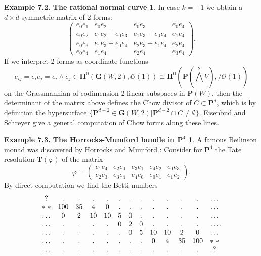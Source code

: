 \documentclass{tran-l}
\newcommand{\GG}{\mathbf{G}}
\newcommand{\myH}{\mathbf{H}}
\newcommand{\myP}{\mathbf{P}}
\newcommand{\TT}{\mathbf{T}}
\theoremstyle{plain}
\theoremstyle{remark}
\theoremstyle{definition}
\newtheorem*{definition4}{Example 7.2. The rational normal curve}
\newtheorem*{definition5}{Example 7.3. The Horrocks-Mumford bundle in $\mathbf{P}^{4}$}
\begin{document}
\begin{definition4}
In case $k=-1$ we obtain a $d \times d$ symmetric
matrix of 2-forms:
\begin{equation*}
\left(\begin{matrix}e_{0}e_{1}&e_{0}e_{2}&e_{0}e_{3}&e_{0}e_{4}\\
e_{0}e_{2}&e_{1}e_{2}+e_{0}e_{3}&e_{1}e_{3}+e_{0}e_{4}& e_{1}e_{4}\\
e_{0}e_{3}&e_{1}e_{3}+e_{0}e_{4}&e_{2}e_{3}+e_{1}e_{4}&e_{2}e_{4} \\
e_{0}e_{4}&e_{1}e_{4}&e_{2}e_{4} & e_{3}e_{4}
\end{matrix}\right)
.
\end{equation*}
If we interpret  2-forms as coordinate functions
\begin{equation*}e_{ij}=e_{i}e_{j}=e_{i}\wedge e_{j} \in \myH ^{0}(\GG
(W,2),\mathcal{O} (1)) \cong \myH ^{0}(\myP (\textstyle{\bigwedge^{2}} V),/\mathcal{O}
(1))\end{equation*}
 on the Grassmannian
of codimension 2 linear subspaces in $\myP (W)$, then the  determinant of the
matrix above defines the Chow divisor
of $C\subset \myP ^{d}$, which is by definition the
hypersurface
 $\{\myP ^{d-2} \in \GG (W,2) | \myP ^{d-2} \cap C \ne \emptyset \}$.
Eisenbud and Schreyer \cite{ES1} give a general computation of Chow forms along these lines.
\end{definition4}
\begin{definition5}
A famous Beilinson monad was discovered by Horrocks and
Mumford \cite{HM}:
Consider for $\myP ^{4}$ the Tate resolution $\TT (\varphi )$ of the matrix
\begin{equation*}
\varphi = \left(\begin{matrix}
e_{1}e_{4} & e_{2}e_{0} &e_{3}e_{1} & e_{4}e_{2} & e_{0}e_{3} \\
e_{2}e_{3} & e_{3}e_{4} &e_{4}e_{0} & e_{0}e_{1} & e_{1}e_{2} 
\end{matrix}\right).
\end{equation*}
By direct computation we find the Betti numbers
\begin{equation*}
\setcounter{MaxMatrixCols}{13}
\begin{matrix}
?         & .& . & . & . & . & . & . & . & . & . & . & \ldots \\
  *\; *
   &100&35 & 4 & 0 & . & . & . & . & . & . & . & \ldots \\
\ldots 
   & 0 & 2 & 10&10 & 5 & 0 & . & . & . & . & . &\ldots \\
\ldots 
   & . &.  & . & . & 0 & 2 & 0 & . & . & . & . &\ldots \\
\ldots 
   & . &.  & . & . & . & 0 & 5 & 10&10 & 2 & 0 &\ldots \\
\ldots 
   & . &.  & . & . & . & . & . & 0 & 4 & 35&100&*\;* \\
\ldots 
   & . &.  & . & . & . & . & . & . & . & .& .& ? 
\end{matrix}.
\end{equation*}
\setcounter{MaxMatrixCols}{10}
\end{definition5}
\end{document}
